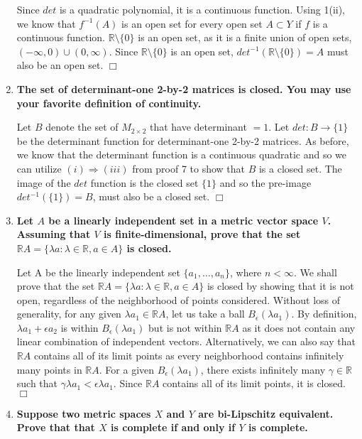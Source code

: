 \documentclass[12pt,letterpaper,reqno]{amsart}
\newcommand{\R}{\mathbb R}
\begin{document}
\begin{enumerate}[1.]
\begin{flushleft}
\[    \]
    Since $det$ is a quadratic polynomial, it is a continuous function. Using 1(ii), we know that $f^{-1}(A)$ is an open set for every open set $A\subset Y$ if $f$ is a continuous function. $\R\setminus\{0\}$ is an open set, as it is a finite union of open sets, $(-\infty, 0) \cup (0, \infty)$. Since $\R\setminus\{0\}$ is an open set, $det^{-1}(\R\setminus\{0\}) = A$ must also be an open set. $\Box$
    \end{flushleft}
\item \textbf{The set of determinant-one 2-by-2 matrices is closed. You may use your favorite definition of continuity.}
\begin{flushleft}
    Let $B$ denote the set of $M_{2\times2}$ that have determinant $= 1$.
    Let $det: B \rightarrow \{1\}$ be the determinant function for determinant-one 2-by-2 matrices. As before, we know that the determinant function is a continuous quadratic and so we can utilize $(i) \Rightarrow (iii)$ from proof 7 to show that $B$ is a closed set. The image of the $det$ function is the closed set $\{1\}$ and so the pre-image $det^{-1}(\{1\}) = B$, must also be a closed set. $\Box$
    \end{flushleft}
\item \textbf{Let $A$ be a linearly independent set in a metric vector space $V$. Assuming that $V$ is finite-dimensional, prove that the set $\R A=\{\lambda a : \lambda \in \R, a\in A\}$ is closed.}
\begin{flushleft}
    Let A be the linearly independent set $\{a_1, \ldots, a_n \}$, where $n < \infty$. We shall prove that the set $\R A=\{\lambda a : \lambda \in \R, a\in A\}$ is closed by showing that it is not open, regardless of the neighborhood of points considered. Without loss of generality, for any given $\lambda a_1 \in \R A$, let us take a ball $B_\epsilon(\lambda a_1)$. By definition, $\lambda a_1 + \epsilon a_2$ is within $B_\epsilon(\lambda a_1)$ but is not within $\R A$ as it does not contain any linear combination of independent vectors. Alternatively, we can also say that $\R A$ contains all of its limit points as every neighborhood contains infinitely many points in $\R A$. For a given $B_\epsilon(\lambda a_1)$, there exists infinitely many $\gamma \in \R$ such that $\gamma \lambda a_1 < \epsilon \lambda a_1$. Since $\R A$ contains all of its limit points, it is closed. $\Box$
    \end{flushleft}
\item \textbf{Suppose two metric spaces $X$ and $Y$ are bi-Lipschitz equivalent. Prove that that $X$ is complete if and only if $Y$ is complete.}

\end{enumerate}
\end{document}
